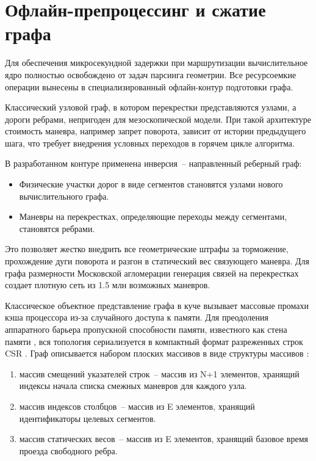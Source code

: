 \section{Офлайн-препроцессинг и сжатие графа}

Для обеспечения микросекундной задержки при маршрутизации вычислительное ядро полностью освобождено от задач парсинга геометрии. Все ресурсоемкие операции вынесены в специализированный офлайн-контур подготовки графа.

Классический узловой граф, в котором перекрестки представляются узлами, а дороги ребрами, непригоден для мезоскопической модели. При такой архитектуре стоимость маневра, например запрет поворота, зависит от истории предыдущего шага, что требует внедрения условных переходов в горячем цикле алгоритма. 

В разработанном контуре применена инверсия~-- направленный реберный граф:
\begin{itemize}
    \item Физические участки дорог в виде сегментов становятся узлами нового вычислительного графа.
    \item Маневры на перекрестках, определяющие переходы между сегментами, становятся ребрами.
\end{itemize}
Это позволяет жестко внедрить все геометрические штрафы за торможение, прохождение дуги поворота и разгон в статический вес связующего маневра. Для графа размерности Московской агломерации генерация связей на перекрестках создает плотную сеть из 1.5 млн возможных маневров.

Классическое объектное представление графа в куче вызывает массовые промахи кэша процессора из-за случайного доступа к памяти. Для преодоления аппаратного барьера пропускной способности памяти, известного как стена памяти \cite{mutlu2020primer}, вся топология сериализуется в компактный формат разреженных строк CSR \cite{drepper2007memory}. Граф описывается набором плоских массивов в виде структуры массивов \cite{strzodka_aos_soa}:
\begin{enumerate}
    \item массив смещений указателей строк~-- массив из N+1 элементов, хранящий индексы начала списка смежных маневров для каждого узла.
    \item массив индексов столбцов~-- массив из E элементов, хранящий идентификаторы целевых сегментов.
    \item массив статических весов~-- массив из E элементов, хранящий базовое время проезда свободного ребра.
\end{enumerate}

